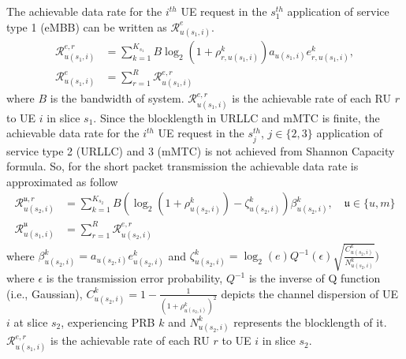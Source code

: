 \documentclass{article}
\begin{document}
The achievable data rate for the $i^{th}$ UE request in the $s_{1}^{th}$ application of service type 1 (eMBB) can be written as $\mathcal{R}_{u(s_1,i)}^{e}$.
\begin{equation}\label{eq1}
\begin{split}
\mathcal{R}_{u(s_1,i)}^{e,r} &= \sum_{k=1}^{K_{s_1}} B \log_2({1+ \rho_{r,u(s_1,i)}^{k}})a_{u(s_1,i)} e^k_{r,u(s_1,i)},\\
\mathcal{R}_{u(s_1,i)}^{e} &= \sum_{r=1}^{R}\mathcal{R}_{u(s_1,i)}^{e,r} 
\end{split}
\end{equation}
where $B$ is the bandwidth of system. 
$\mathcal{R}_{u(s_1,i)}^{e,r}$ is the achievable rate of each RU $r$ to UE $i$ in slice $s_1$.
Since the blocklength in URLLC and mMTC is finite, the achievable data rate for the $i^{th}$ UE request in the $s_{j}^{th} $, $j \in \{2,3\}$ application of service type 2 (URLLC) and 3 (mMTC) is not achieved from Shannon Capacity formula. So, for the short packet transmission the achievable data rate is approximated as follow
\begin{equation}\label{eq11}
\begin{split}
\mathcal{R}_{u(s_2,i)}^{\mathfrak{u},r} &= \sum_{k=1}^{K_{s_2}} B (\log_2({1+ \rho_{u(s_2,i)}^{k}})- \zeta_{u(s_2,i)}^{k}){\beta}_{u(s_2,i)}^{k}, \quad \mathfrak{u} \in  \{u,m\} \\
\mathcal{R}_{u(s_1,i)}^{\mathfrak{u}} &= \sum_{r=1}^{R}\mathcal{R}_{u(s_2,i)}^{e,r} 
\end{split}
\end{equation}
where ${\beta}_{u(s_2,i)}^{k}=a_{u(s_2,i)} e^{k}_{u(s_2,i)}$
and $\zeta_{u(s_2,i)}^{k} = \log_2({e})Q^{-1}(\epsilon) \sqrt{\frac{C_{u(s_2,i)}^{k}}{N_{u(s_2,i)}^{k}}})$
where $\epsilon$ is the transmission error probability, $Q^{-1}$ is the inverse of Q function (i.e., Gaussian),
$C_{u(s_2,i)}^{k} = 1 - \frac{1}{(1+\rho_{u(s_2,i)}^{k})^2}$ depicts the channel dispersion of UE  $i$ at slice $s_2$, experiencing PRB $k$ and
$N_{u(s_2,i)}^{k}$ represents the blocklength of it. 
$\mathcal{R}_{u(s_1,i)}^{e,r}$ is the achievable rate of each RU $r$ to UE $i$ in slice $s_2$.
\end{document}

